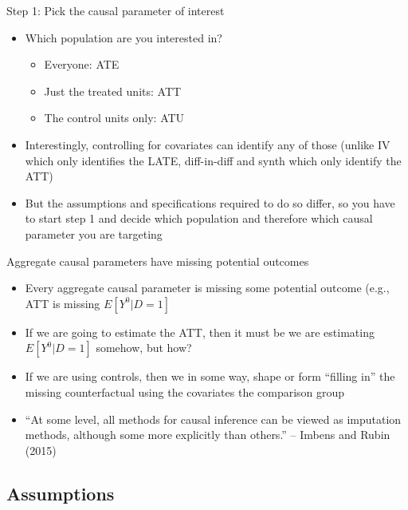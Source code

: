 \documentclass{beamer}
\begin{document}
\begin{frame}{Step 1: Pick the causal parameter of interest}

\begin{itemize}
\item Which population are you interested in?  
	\begin{itemize}
	\item Everyone: ATE
	\item Just the treated units: ATT
	\item The control units only: ATU
	\end{itemize}
\item Interestingly, controlling for covariates can identify any of those (unlike IV which only identifies the LATE, diff-in-diff and synth which only identify the ATT)
\item But the assumptions and specifications required to do so differ, so you have to start step 1 and decide which population and therefore which causal parameter you are targeting

\end{itemize}

\end{frame}


\begin{frame}{Aggregate causal parameters have missing potential outcomes}


\begin{itemize}
\item Every aggregate causal parameter is missing some potential outcome (e.g., ATT is missing $E[Y^0|D=1]$
\item If we are going to estimate the ATT, then it must be we are estimating $E[Y^0|D=1]$ somehow, but how?
\item If we are using controls, then we in some way, shape or form ``filling in'' the missing counterfactual using the covariates the comparison group
\item ``At some level, all methods for causal inference can be viewed as imputation methods, although some more explicitly than others.'' -- Imbens and Rubin (2015)

\end{itemize}


\end{frame}

\subsection{Assumptions}
\end{document}
